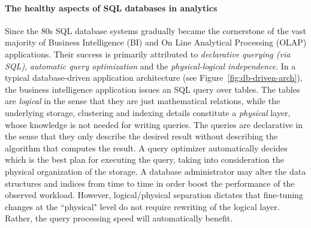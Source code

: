 

\paragraph{The healthy aspects of SQL databases in analytics}
Since the 80s SQL database systems gradually became the cornerstone of
the vast majority of Business Intelligence (BI) and On Line Analytical
Processing (OLAP) applications. 
Their success is primarily attributed to {\em declarative querying
(via SQL)}, {\em automatic query optimization} and the {\em
physical-logical independence}. In a typical database-driven
application architecture (see Figure~\ref{fig:db-driven-arch}), the
business intelligence application issues an SQL query over tables. The
tables are {\em logical} in the sense that they are just mathematical
relations, while the underlying storage, clustering and indexing
details constitute a {\em physical} layer, whose knowledge is not
needed for writing queries. The queries are declarative in the sense
that they only describe the desired result without describing the
algorithm that computes the result. A query optimizer automatically
decides which is the best plan for executing the query, taking into
consideration the physical organization of the storage. A database
administrator may alter the data structures and indices from time to
time in order boost the performance of the observed workload. However,
logical/physical separation dictates that fine-tuning changes at the ``physical" level do not require rewriting of the logical layer. Rather, the query processing speed will automatically benefit.




